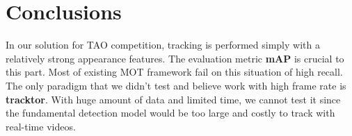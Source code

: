 \documentclass[runningheads]{llncs}
\begin{document}
\section{Conclusions}

In our solution for TAO competition, tracking is performed simply with a relatively strong appearance features. The evaluation metric \textbf{mAP} is crucial to this part. Most of existing MOT framework fail on this situation of high recall. The only paradigm that we didn't test and believe work with high frame rate is \textbf{tracktor}\cite{tracktor_2019_ICCV}. With huge amount of data and limited time, we cannot test it since the fundamental detection model would be too large and costly to track with real-time videos.





\end{document}
